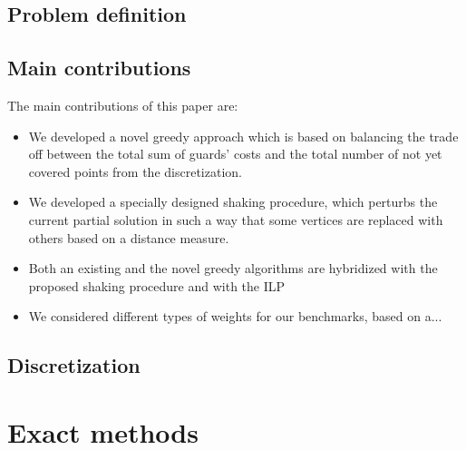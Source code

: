 \documentclass[runningheads,a4paper]{elsarticle}
\begin{document}
\subsection{Problem definition}


\subsection{Main contributions}
The main contributions of this paper are:
\begin{itemize}
\item We developed a novel greedy approach which is based on balancing the trade off between the total sum of guards' costs and the total number of not yet covered points from the discretization.
\item We developed a specially designed shaking procedure, which perturbs the current partial solution in such a way that some vertices are replaced with others based on a distance measure.
\item Both an existing and the novel greedy algorithms are hybridized with the proposed shaking procedure and with the ILP
\item We considered different types of weights for our benchmarks, based on a... 
\end{itemize}


     \subsection{Discretization}  

     \section{Exact methods}
\end{document}
